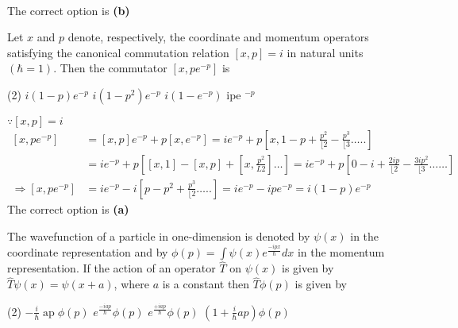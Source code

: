 \begin{enumerate}
\begin{answer}
\begin{align*}
	\end{align*}
The correct option is \textbf{(b)}
\end{answer}
\begin{minipage}{\textwidth}
	\item Let $x$ and $p$ denote, respectively, the coordinate and momentum operators satisfying the canonical commutation relation $[x, p]=i$ in natural units $(\hbar=1)$. Then the commutator $\left[x, p e^{-p}\right]$ is
\end{minipage}
\begin{tasks}(2)
	\task[\textbf{A.}] $i(1-p) e^{-p}$
	\task[\textbf{B.}]$i\left(1-p^{2}\right) e^{-p}$
	\task[\textbf{C.}]$i\left(1-e^{-p}\right)$
	\task[\textbf{D.}]ipe $^{-p}$
\end{tasks}
\begin{answer}
	$\because[x, p]=i$\\
	\begin{align*}
		\left[x, p e^{-p}\right] &=[x, p] e^{-p}+p\left[x, e^{-p}\right]=i e^{-p}+p\left[x, 1-p+\frac{p^{2}}{\lfloor 2}-\frac{p^{3}}{\lfloor 3} \ldots . .\right] \\
		&=i e^{-p}+p\left[[x, 1]-[x, p]+\left[x, \frac{p^{2}}{L 2}\right] \ldots\right]=i e^{-p}+p\left[0-i+\frac{2 i p}{\lfloor 2}-\frac{3 i p^{2}}{\lfloor 3} \ldots \ldots\right] \\
		\Rightarrow\left[x, p e^{-p}\right] &=i e^{-p}-i\left[p-p^{2}+\frac{p^{3}}{\lfloor 2} \ldots . .\right]=i e^{-p}-i p e^{-p}=i(1-p) e^{-p}
	\end{align*}
	The correct option is \textbf{(a)}
\end{answer}
\begin{minipage}{\textwidth}
	\item The wavefunction of a particle in one-dimension is denoted by $\psi(x)$ in the coordinate representation and by $\phi(p)=\int \psi(x) e^{\frac{-i p x}{\hbar}} d x$ in the momentum representation. If the action of an operator $\hat{T}$ on $\psi(x)$ is given by $\hat{T} \psi(x)=\psi(x+a)$, where $a$ is a constant then $\hat{T} \phi(p)$ is given by
\end{minipage}
\begin{tasks}(2)
	\task[\textbf{A.}] $-\frac{i}{\hbar} \operatorname{ap} \phi(p)$
	\task[\textbf{B.}]$e^{\frac{-i a p}{\hbar}} \phi(p)$
	\task[\textbf{C.}]$e^{\frac{+i a p}{\hbar}} \phi(p)$
	\task[\textbf{D.}]$\left(1+\frac{i}{\hbar} a p\right) \phi(p)$
\end{tasks}
\begin{answer}

\end{answer}
\end{enumerate}
